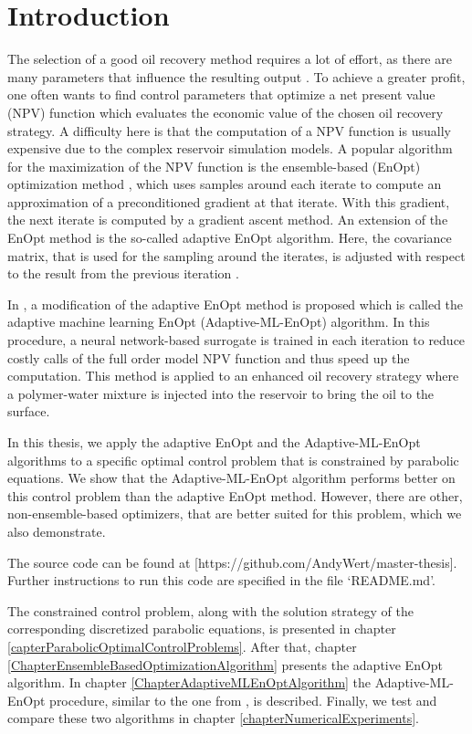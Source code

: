 \chapter{Introduction}

The selection of a good oil recovery method requires a lot of effort, as there are many parameters that influence the resulting output \cite{doi:10.1137/1.9780898717075}. To achieve a greater profit, one often wants to find control parameters that optimize a net present value (NPV) function which evaluates the economic value of the chosen oil recovery strategy. A difficulty here is that the computation of a NPV function is usually expensive due to the complex reservoir simulation models. A popular algorithm for the maximization of the NPV function is the ensemble-based (EnOpt) optimization method \cite{articleChen}, which uses samples around each iterate to compute an approximation of a preconditioned gradient at that iterate. With this gradient, the next iterate is computed by a gradient ascent method. An extension of the EnOpt method is the so-called adaptive EnOpt algorithm. Here, the covariance matrix, that is used for the sampling around the iterates, is adjusted with respect to the result from the previous iteration \cite{Stordal2016-cj}.

In \cite{Keil2022-dj}, a modification of the adaptive EnOpt method is proposed which is called the adaptive machine learning EnOpt (Adaptive-ML-EnOpt) algorithm. In this procedure, a neural network-based surrogate is trained in each iteration to reduce costly calls of the full order model NPV function and thus speed up the computation. This method is applied to an enhanced oil recovery strategy \cite{ABIDIN201211} where a polymer-water mixture is injected into the reservoir to bring the oil to the surface.

In this thesis, we apply the adaptive EnOpt and the Adaptive-ML-EnOpt algorithms to a specific optimal control problem that is constrained by parabolic equations. We show that the Adaptive-ML-EnOpt algorithm performs better on this control problem than the adaptive EnOpt method. However, there are other, non-ensemble-based optimizers, that are better suited for this problem, which we also demonstrate.

The source code can be found at [https://github.com/AndyWert/master-thesis]. Further instructions to run this code are specified in the file `README.md'.

The constrained control problem, along with the solution strategy of the corresponding discretized parabolic equations, is presented in chapter \ref{capterParabolicOptimalControlProblems}. After that, chapter \ref{ChapterEnsembleBasedOptimizationAlgorithm} presents the adaptive EnOpt algorithm. In chapter \ref{ChapterAdaptiveMLEnOptAlgorithm} the Adaptive-ML-EnOpt procedure, similar to the one from \cite{Keil2022-dj}, is described. Finally, we test and compare these two algorithms in chapter \ref{chapterNumericalExperiments}.